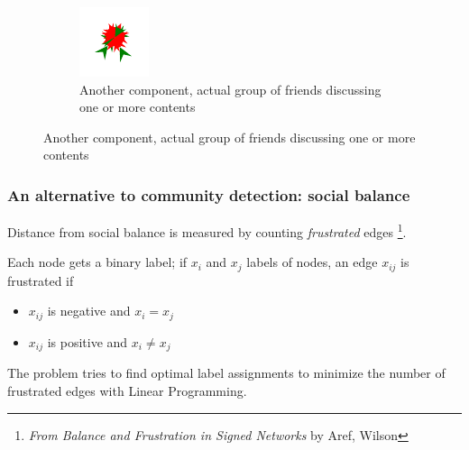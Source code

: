 \documentclass{beamer}
\begin{document}
\begin{frame}[c]
\begin{figure}
\begin{center}
\begin{subfigure}[b]{0.4\textwidth}
                \includegraphics[width=\textwidth]{img/nytimes-small1.png}
                \caption{Another component, actual group of friends discussing
                one or more contents}
            \end{subfigure}
        \end{center}
    \end{figure}

\end{frame}

\begin{frame}[c]
    \frametitle{An alternative to community detection: social balance}

    Distance from social balance is measured by counting \textit{frustrated}
    edges
    \footnote{\textit{From Balance and Frustration in Signed Networks} by Aref,
    Wilson}.

    Each node gets a binary label; if $x_i$ and $x_j$ labels of nodes, an edge $x _{ij} $ is frustrated if
    \begin{itemize}
        \item $x _{ij} $ is negative and $x_i = x_j$
        \item $x _{ij} $ is positive and $x_i \neq x_j$
    \end{itemize}

    The problem tries to find optimal label assignments to minimize the number of
    frustrated edges with Linear Programming.
\end{frame}
\end{document}
